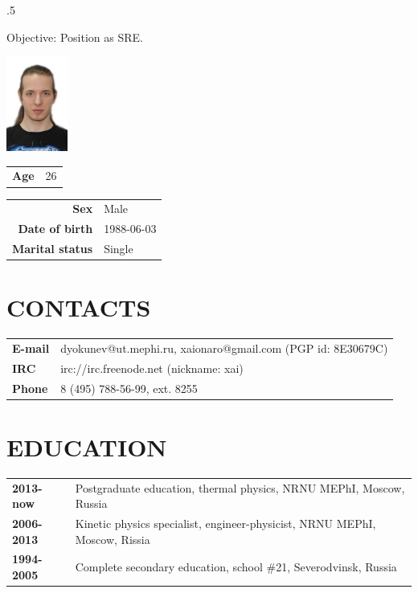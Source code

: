 \address{115522, 2 Moskvorechie Street (building 1), Moscow, Russia}


\begin{resume}
\vspace{0.1in}
\moveleft.5\sectionwidth\centerline{Objective: Position as SRE.}  

\vspace{-6.5em}
\flushright
\includegraphics[width=20mm]{photo.jpg}\\
\begin{tabular}{ll}
 {\bf Age} & 26\\
\end{tabular}
\flushleft

\vspace{-5.5em}
\begin{tabular}{rl}
 {\bf Sex}            & Male\\
 {\bf Date of birth}  & 1988-06-03\\
 {\bf Marital status} & Single\\
\end{tabular}

\section{CONTACTS}
\vspace{0.1in} 
\begin{tabular}{ll}
 {\bf E-mail} & dyokunev@ut.mephi.ru, xaionaro@gmail.com (PGP id: 8E30679C)\\
 {\bf IRC}    & irc://irc.freenode.net (nickname: xai)\\
 {\bf Phone}  & 8 (495) 788-56-99, ext. 8255\\
\end{tabular}

\section{EDUCATION}
\vspace{0.1in} 
\begin{tabular}{ll}
 {\bf 2013-now } & Postgraduate education, thermal physics, NRNU MEPhI, Moscow, Russia\\
 {\bf 2006-2013} & Kinetic physics specialist, engineer-physicist, NRNU MEPhI, Moscow, Rissia\\
 {\bf 1994-2005} & Complete secondary education, school \#21, Severodvinsk, Russia\\
\end{tabular}


\end{resume}
